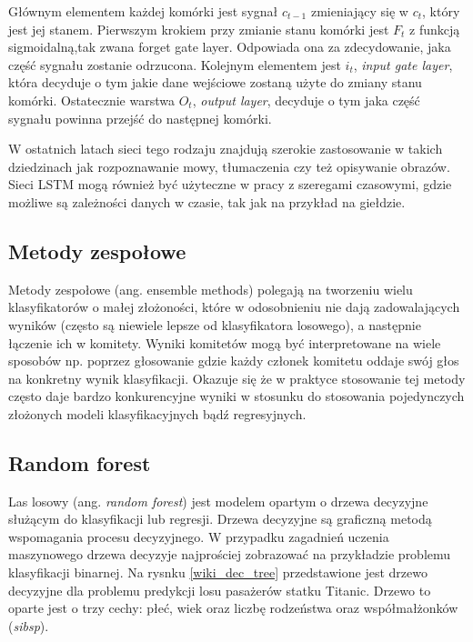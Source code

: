 \documentclass[a4paper, twoside, 11pt, openright]{article}
\begin{document}
Głównym elementem każdej komórki jest sygnał $c_{t-1}$ zmieniający się w $c_{t}$, który jest jej stanem. Pierwszym krokiem przy zmianie stanu komórki jest $F_t$ z funkcją sigmoidalną,tak zwana forget gate layer.  Odpowiada ona za zdecydowanie, jaka część sygnału zostanie odrzucona. Kolejnym elementem jest $i_t$, \textit{input gate layer}, która decyduje o tym jakie dane wejściowe zostaną użyte do zmiany stanu komórki. Ostatecznie warstwa $O_t$, \textit{output layer}, decyduje o tym jaka część sygnału powinna przejść do następnej komórki.

\bigskip

W ostatnich latach sieci tego rodzaju znajdują szerokie zastosowanie w takich dziedzinach jak rozpoznawanie mowy, tłumaczenia czy też opisywanie obrazów. Sieci LSTM mogą również być użyteczne w pracy z szeregami czasowymi, gdzie możliwe są zależności danych w czasie, tak jak na przykład na 
giełdzie. 

\subsection{Metody zespołowe}

Metody zespołowe (ang. ensemble methods) polegają na tworzeniu wielu klasyfikatorów o małej złożoności, które w odosobnieniu nie dają zadowalających wyników (często są niewiele lepsze od klasyfikatora losowego), a następnie łączenie ich w komitety. Wyniki komitetów mogą być interpretowane na wiele sposobów np. poprzez głosowanie gdzie każdy członek komitetu oddaje swój głos na konkretny wynik klasyfikacji. Okazuje się że w praktyce stosowanie tej metody często daje bardzo konkurencyjne wyniki w stosunku do stosowania pojedynczych złożonych modeli klasyfikacyjnych bądź regresyjnych.

\subsection{Random forest \cite{randforest}}

Las losowy (ang. \textit{random forest}) jest modelem opartym o drzewa decyzyjne służącym do klasyfikacji lub regresji. Drzewa decyzyjne są graficzną metodą wspomagania procesu decyzyjnego. W przypadku zagadnień uczenia maszynowego drzewa decyzyje najprościej zobrazować na przykładzie problemu klasyfikacji binarnej. Na rysnku \ref{wiki_dec_tree} przedstawione jest drzewo decyzyjne dla problemu predykcji losu pasażerów statku Titanic. Drzewo to oparte jest o trzy cechy: płeć, wiek oraz liczbę rodzeństwa oraz współmałżonków (\textit{sibsp}). 
\end{document}
